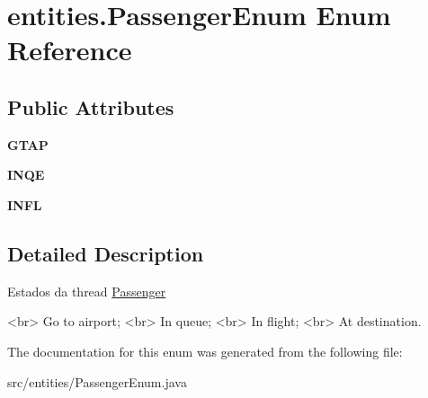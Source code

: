 \hypertarget{enumentities_1_1_passenger_enum}{}\section{entities.\+Passenger\+Enum Enum Reference}
\label{enumentities_1_1_passenger_enum}
\subsection*{Public Attributes}
\begin{DoxyCompactItemize}
\item 
\mbox{\label{enumentities_1_1_passenger_enum_ab82aeb5b9c67246e82f69ba14e936a22}} 
{\bfseries G\+T\+AP}
\item 
\mbox{\label{enumentities_1_1_passenger_enum_a25ddab644876bff4f8aa3698c3387f64}} 
{\bfseries I\+N\+QE}
\item 
\mbox{\label{enumentities_1_1_passenger_enum_aad6e7d7674cf50860d2a6cd6b972c37f}} 
{\bfseries I\+N\+FL}
\end{DoxyCompactItemize}


\subsection{Detailed Description}
Estados da thread \hyperlink{classentities_1_1_passenger}{Passenger} \begin{DoxyVerb}<br> Go to airport;
<br> In queue;
<br> In flight;
<br> At destination.\end{DoxyVerb}
 

The documentation for this enum was generated from the following file\+:\begin{DoxyCompactItemize}
\item 
src/entities/Passenger\+Enum.\+java\end{DoxyCompactItemize}
